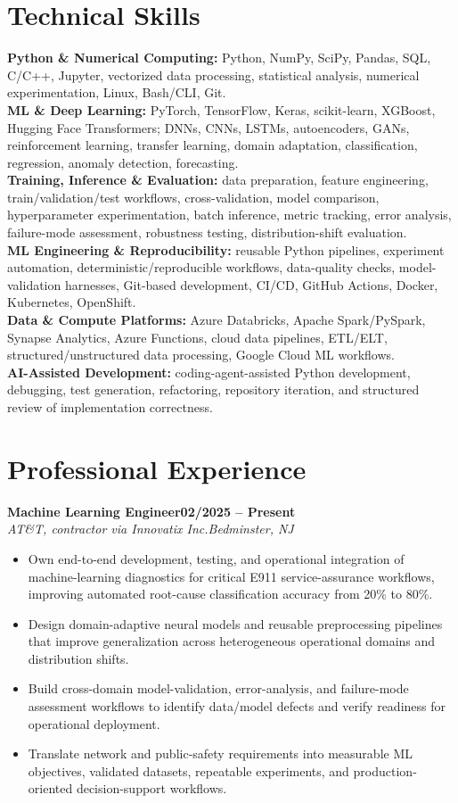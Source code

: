 \documentclass[10pt,letterpaper]{extarticle}
\newcommand{\role}[4]{\Needspace{3\baselineskip}\textbf{#1}\hfill\textbf{#2}\\[-1pt]\textit{#3}\hfill\textit{#4}\par}
\begin{document}
\section{Technical Skills}
\textbf{Python \& Numerical Computing:} Python, NumPy, SciPy, Pandas, SQL, C/C++, Jupyter, vectorized data processing, statistical analysis, numerical experimentation, Linux, Bash/CLI, Git.\\
\textbf{ML \& Deep Learning:} PyTorch, TensorFlow, Keras, scikit-learn, XGBoost, Hugging Face Transformers; DNNs, CNNs, LSTMs, autoencoders, GANs, reinforcement learning, transfer learning, domain adaptation, classification, regression, anomaly detection, forecasting.\\
\textbf{Training, Inference \& Evaluation:} data preparation, feature engineering, train/validation/test workflows, cross-validation, model comparison, hyperparameter experimentation, batch inference, metric tracking, error analysis, failure-mode assessment, robustness testing, distribution-shift evaluation.\\
\textbf{ML Engineering \& Reproducibility:} reusable Python pipelines, experiment automation, deterministic/reproducible workflows, data-quality checks, model-validation harnesses, Git-based development, CI/CD, GitHub Actions, Docker, Kubernetes, OpenShift.\\
\textbf{Data \& Compute Platforms:} Azure Databricks, Apache Spark/PySpark, Synapse Analytics, Azure Functions, cloud data pipelines, ETL/ELT, structured/unstructured data processing, Google Cloud ML workflows.\\
\textbf{AI-Assisted Development:} coding-agent-assisted Python development, debugging, test generation, refactoring, repository iteration, and structured review of implementation correctness.

\section{Professional Experience}
\role{Machine Learning Engineer}{02/2025 -- Present}{AT\&T, contractor via Innovatix Inc.}{Bedminster, NJ}
\begin{itemize}
\item Own end-to-end development, testing, and operational integration of machine-learning diagnostics for critical E911 service-assurance workflows, improving automated root-cause classification accuracy from 20\% to 80\%.
\item Design domain-adaptive neural models and reusable preprocessing pipelines that improve generalization across heterogeneous operational domains and distribution shifts.
\item Build cross-domain model-validation, error-analysis, and failure-mode assessment workflows to identify data/model defects and verify readiness for operational deployment.
\item Translate network and public-safety requirements into measurable ML objectives, validated datasets, repeatable experiments, and production-oriented decision-support workflows.
\end{itemize}
\end{document}
